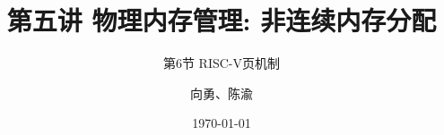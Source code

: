 


\title[第5讲]{第五讲 物理内存管理: 非连续内存分配} %
\subtitle{第6节 RISC-V页机制}
\author{向勇、陈渝} %
\date{\today} %



\begin{frame}
\titlepage %
\end{frame}


